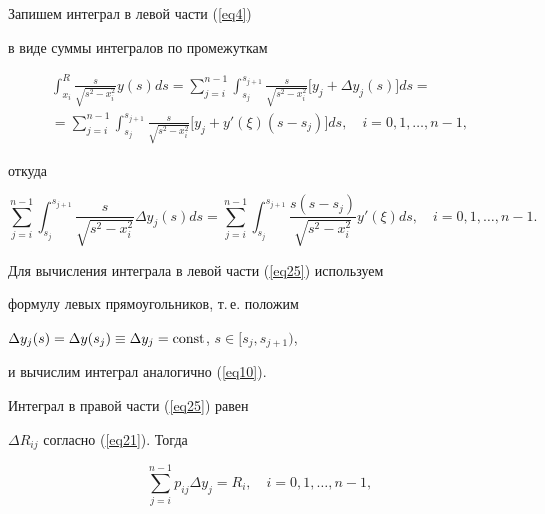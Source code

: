\begin{pf}


Запишем интеграл в левой части (\ref{eq4})


в виде суммы интегралов по промежуткам


\begin{multline*}


\int_{x_i}^R\frac{s}{\sqrt{s^2-x_i^2}}y(s)ds=


\sum_{j=i}^{n-1}\int_{s_j}^{s_{j+1}}\frac{s}{\sqrt{s^2-x_i^2}}


\big[y_j+\Delta y_j(s)\big]ds=\\


%


=\sum_{j=i}^{n-1}\int_{s_j}^{s_{j+1}}\frac{s}{\sqrt{s^2-x_i^2}}


\big[y_j+y'(\xi)(s-s_j)\big]ds, \quad i=0,1,\dotsc,n-1,


\end{multline*}


откуда


\begin{equation}


\label{eq25}


\sum_{j=i}^{n-1}\int_{s_j}^{s_{j+1}}\frac{s}{\sqrt{s^2-x_i^2}}


\Delta y_j(s)ds=\sum_{j=i}^{n-1}\int_{s_j}^{s_{j+1}}


\frac{s(s-s_j)}{\sqrt{s^2-x_i^2}}y'(\xi)ds,


\quad i=0,1,\dotsc,n-1.


\end{equation}





Для вычисления интеграла в левой части (\ref{eq25}) используем


формулу левых прямоугольников, т.\,е. положим


$\Delta y_j(s)=\Delta y(s_j)\equiv\Delta y_j=\operatorname{const}$, $s\in[s_j,s_{j+1})$,


и вычислим интеграл аналогично (\ref{eq10}).


Интеграл в правой части (\ref{eq25}) равен


$\Delta R_{ij}$ согласно (\ref{eq21}). Тогда


\begin{equation}


\label{eq26}


\sum_{j=i}^{n-1}p_{ij}\Delta y_j=R_i, \quad i=0,1,\dotsc,n-1,


\end{equation}



\end{pf}
